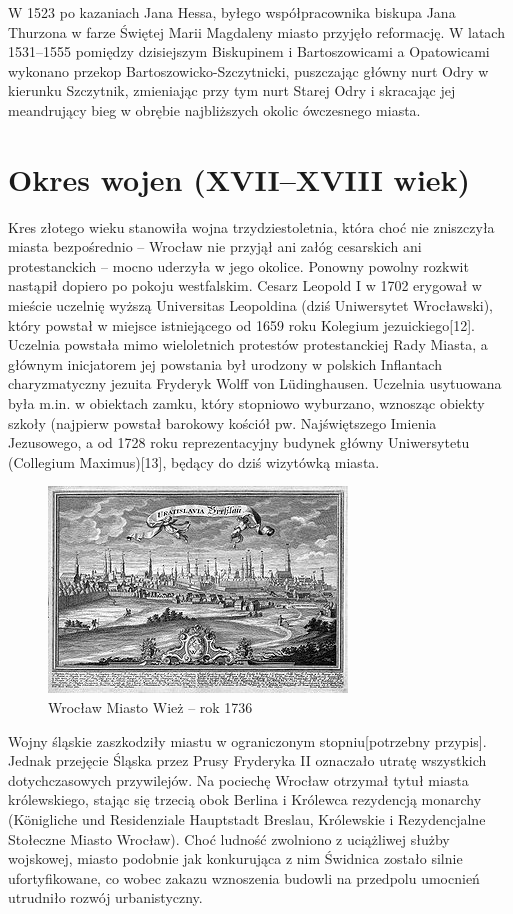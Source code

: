 \documentclass{article}
\begin{document}
\bigskip
\newline
W 1523 po kazaniach Jana Hessa, byłego współpracownika biskupa Jana Thurzona w farze Świętej Marii Magdaleny miasto przyjęło reformację.
\bigskip
\newline
W latach 1531–1555 pomiędzy dzisiejszym Biskupinem i Bartoszowicami a Opatowicami wykonano przekop Bartoszowicko-Szczytnicki, puszczając główny nurt Odry w kierunku Szczytnik, zmieniając przy tym nurt Starej Odry i skracając jej meandrujący bieg w obrębie najbliższych okolic ówczesnego miasta.
\section{Okres wojen (XVII–XVIII wiek)}
Kres złotego wieku stanowiła wojna trzydziestoletnia, która choć nie zniszczyła miasta bezpośrednio – Wrocław nie przyjął ani załóg cesarskich ani protestanckich – mocno uderzyła w jego okolice. Ponowny powolny rozkwit nastąpił dopiero po pokoju westfalskim. Cesarz Leopold I w 1702 erygował w mieście uczelnię wyższą Universitas Leopoldina (dziś Uniwersytet Wrocławski), który powstał w miejsce istniejącego od 1659 roku Kolegium jezuickiego[12]. Uczelnia powstała mimo wieloletnich protestów protestanckiej Rady Miasta, a głównym inicjatorem jej powstania był urodzony w polskich Inflantach charyzmatyczny jezuita Fryderyk Wolff von Lüdinghausen. Uczelnia usytuowana była m.in. w obiektach zamku, który stopniowo wyburzano, wznosząc obiekty szkoły (najpierw powstał barokowy kościół pw. Najświętszego Imienia Jezusowego, a od 1728 roku reprezentacyjny budynek główny Uniwersytetu (Collegium Maximus)[13], będący do dziś wizytówką miasta.
\bigskip
\newline
\begin{figure}[h]
\centering
\includegraphics[scale=1]{5.jpg}
\caption{Wrocław Miasto Wież – rok 1736}
\end{figure}
\bigskip
\newline
Wojny śląskie zaszkodziły miastu w ograniczonym stopniu[potrzebny przypis]. Jednak przejęcie Śląska przez Prusy Fryderyka II oznaczało utratę wszystkich dotychczasowych przywilejów. Na pociechę Wrocław otrzymał tytuł miasta królewskiego, stając się trzecią obok Berlina i Królewca rezydencją monarchy (Königliche und Residenziale Hauptstadt Breslau, Królewskie i Rezydencjalne Stołeczne Miasto Wrocław).
\bigskip
\newline
Choć ludność zwolniono z uciążliwej służby wojskowej, miasto podobnie jak konkurująca z nim Świdnica zostało silnie ufortyfikowane, co wobec zakazu wznoszenia budowli na przedpolu umocnień utrudniło rozwój urbanistyczny.
\end{document}
